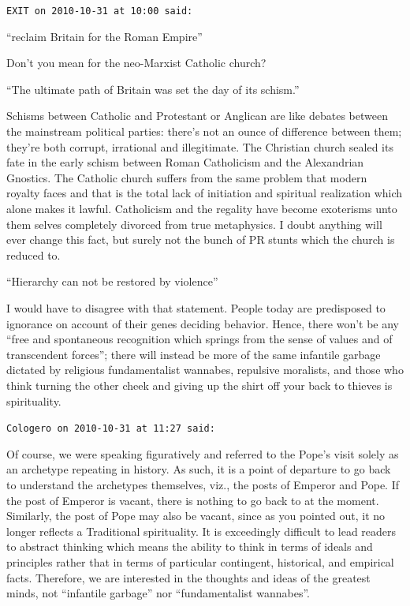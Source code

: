 \begin{footnotesize}
\begin{sffamily}
\texttt{EXIT on 2010-10-31 at 10:00 said:}

``reclaim Britain for the Roman Empire''

Don't you mean for the neo-Marxist Catholic church?

``The ultimate path of Britain was set the day of its schism.''

Schisms between Catholic and Protestant or Anglican are like debates between the mainstream political parties: there's not an ounce of difference between them; they're both corrupt, irrational and illegitimate. The Christian church sealed its fate in the early schism between Roman Catholicism and the Alexandrian Gnostics. The Catholic church suffers from the same problem that modern royalty faces and that is the total lack of initiation and spiritual realization which alone makes it lawful. Catholicism and the regality have become exoterisms unto them selves completely divorced from true metaphysics. I doubt anything will ever change this fact, but surely not the bunch of PR stunts which the church is reduced to.

``Hierarchy can not be restored by violence''

I would have to disagree with that statement. People today are predisposed to ignorance on account of their genes deciding behavior. Hence, there won't be any ``free and spontaneous recognition which springs from the sense of values and of transcendent forces''; there will instead be more of the same infantile garbage dictated by religious fundamentalist wannabes, repulsive moralists, and those who think turning the other cheek and giving up the shirt off your back to thieves is spirituality.

\hfill

\texttt{Cologero on 2010-10-31 at 11:27 said:}

Of course, we were speaking figuratively and referred to the Pope's visit solely as an archetype repeating in history. As such, it is a point of departure to go back to understand the archetypes themselves, viz., the posts of Emperor and Pope. If the post of Emperor is vacant, there is nothing to go back to at the moment. Similarly, the post of Pope may also be vacant, since as you pointed out, it no longer reflects a Traditional spirituality. It is exceedingly difficult to lead readers to abstract thinking which means the ability to think in terms of ideals and principles rather that in terms of particular contingent, historical, and empirical facts. Therefore, we are interested in the thoughts and ideas of the greatest minds, not ``infantile garbage'' nor ``fundamentalist wannabes''.


\end{sffamily}
\end{footnotesize}
